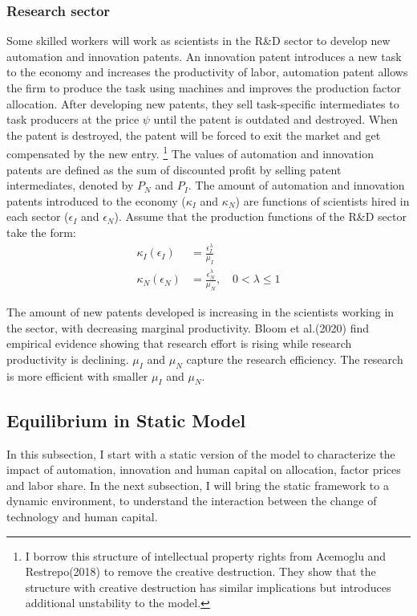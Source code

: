 \documentclass[12pt]{article}
\begin{document}
\subsubsection*{Research sector}
Some skilled workers will work as scientists in the R\&D sector to develop new automation and innovation patents. An innovation patent introduces a new task to the economy and increases the productivity of labor, automation patent allows the firm to produce the task using machines and improves the production factor allocation. After developing new patents, they sell task-specific intermediates to task producers at the price $\psi$ until the patent is outdated and destroyed. When the patent is destroyed, the patent will be forced to exit the market and get compensated by the new entry. \footnote{I borrow this structure of intellectual property rights from Acemoglu and Restrepo(2018)\cite{AcemogluRestrepo2018} to remove the creative destruction. They show that the structure with creative destruction has similar implications but introduces additional unstability to the model.} The values of automation and innovation patents are defined as the sum of discounted profit by selling patent intermediates, denoted by $P_N$ and $P_I$. The amount of automation and innovation patents introduced to the economy ($\kappa_I$ and $\kappa_N$) are functions of scientists hired in each sector ($\epsilon_I$ and $\epsilon_N$).
Assume that the production functions of the R\&D sector take the form: 
\begin{align*}
\kappa_I(\epsilon_I) &= \frac{\epsilon_I^\lambda}{\mu_I} \\
\kappa_N(\epsilon_N) &= \frac{\epsilon_N^\lambda}{\mu_N}, \quad 0<\lambda\leq 1
\end{align*}

The amount of new patents developed is increasing in the scientists working in the sector, with decreasing marginal productivity. Bloom et al.(2020)\cite{Bloometal2020} find empirical evidence showing that research effort is rising while research productivity is declining. $\mu_I$ and $\mu_N$ capture the research efficiency. The research is more efficient with smaller $\mu_I$ and $\mu_N$. 

\subsection{Equilibrium in Static Model}
In this subsection, I start with a static version of the model to characterize the impact of automation, innovation and human capital on allocation, factor prices and labor share. In the next subsection, I will bring the static framework to a dynamic environment, to understand the interaction between the change of technology and human capital. 
\end{document}
